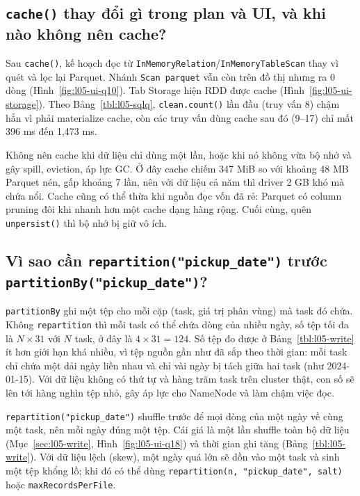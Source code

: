\documentclass[
  12pt,
  a4paper,
]{article}
\begin{document}
\subsection{\texorpdfstring{\texttt{cache()} thay đổi gì trong plan và
UI, và khi nào không nên
cache?}{cache() thay đổi gì trong plan và UI, và khi nào không nên cache?}}\label{sec:l05-q7}

Sau \texttt{cache()}, kế hoạch đọc từ
\texttt{InMemoryRelation}\allowbreak{}/\texttt{InMemoryTableScan}\allowbreak{}
thay vì quét và lọc lại Parquet. Nhánh \texttt{Scan\ parquet} vẫn còn
trên đồ thị nhưng ra 0 dòng (Hình~\ref{fig:l05-ui-q10}). Tab Storage
hiện RDD được cache (Hình~\ref{fig:l05-ui-storage}). Theo
Bảng~\ref{tbl:l05-sqlq}, \texttt{clean.count()} lần đầu (truy vấn 8)
chậm hẳn vì phải materialize cache, còn các truy vấn dùng cache sau đó
(9--17) chỉ mất 396 ms đến 1,473 ms.

Không nên cache khi dữ liệu chỉ dùng một lần, hoặc khi nó không vừa bộ
nhớ và gây spill, eviction, áp lực GC. Ở đây cache chiếm 347 MiB so với
khoảng 48 MB Parquet nén, gấp khoảng 7 lần, nên với dữ liệu cả năm thì
driver 2 GB khó mà chứa nổi. Cache cũng có thể thừa khi nguồn đọc vốn đã
rẻ: Parquet có column pruning đôi khi nhanh hơn một cache dạng hàng
rộng. Cuối cùng, quên \texttt{unpersist()} thì bộ nhớ bị giữ vô ích.

\subsection{\texorpdfstring{Vì sao cần
\texttt{repartition("pickup\_}\allowbreak{}\texttt{date")}\allowbreak{}
trước
\texttt{partitionBy("pickup\_}\allowbreak{}\texttt{date")}\allowbreak{}?}{Vì sao cần repartition("pickup\_date") trước partitionBy("pickup\_date")?}}\label{sec:l05-q8}

\texttt{partitionBy} ghi một tệp cho mỗi cặp (task, giá trị phân vùng)
mà task đó chứa. Không \texttt{repartition} thì mỗi task có thể chứa
dòng của nhiều ngày, số tệp tối đa là \(N \times 31\) với \(N\) task, ở
đây là \(4 \times 31 = 124\). Số tệp đo được ở Bảng~\ref{tbl:l05-write}
ít hơn giới hạn khá nhiều, vì tệp nguồn gần như đã sắp theo thời gian:
mỗi task chỉ chứa một dải ngày liền nhau và chỉ vài ngày bị tách giữa
hai task (như 2024-01-15). Với dữ liệu không có thứ tự và hàng trăm task
trên cluster thật, con số sẽ lên tới hàng nghìn tệp nhỏ, gây áp lực cho
NameNode và làm chậm việc đọc.

\texttt{repartition("pickup\_}\allowbreak{}\texttt{date")}\allowbreak{}
shuffle trước để mọi dòng của một ngày về cùng một task, nên mỗi ngày
đúng một tệp. Cái giá là một lần shuffle toàn bộ dữ liệu
(Mục~\ref{sec:l05-write}, Hình~\ref{fig:l05-ui-q18}) và thời gian ghi
tăng (Bảng~\ref{tbl:l05-write}). Với dữ liệu lệch (skew), một ngày quá
lớn sẽ dồn vào một task và sinh một tệp khổng lồ; khi đó có thể dùng
\texttt{repartition(n,}\allowbreak{}\texttt{\ "pickup\_}\allowbreak{}\texttt{date",}\allowbreak{}\texttt{\ salt)}\allowbreak{}
hoặc \texttt{maxRecordsPerFile}\allowbreak{}.
\end{document}
